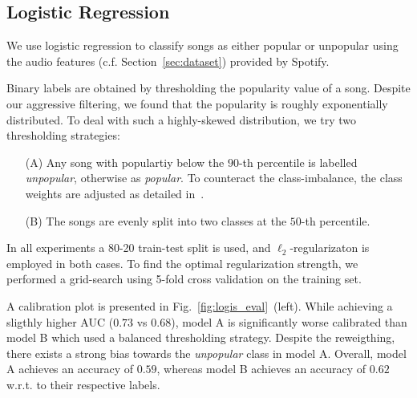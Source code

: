 \documentclass{article}
\begin{document}
\subsection{Logistic Regression}
We use logistic regression to classify songs as either popular or unpopular using the audio features (c.f. Section~\ref{sec:dataset}) provided by Spotify. 

Binary labels are obtained by thresholding the popularity value of a song. Despite our aggressive filtering, we found that the popularity is roughly exponentially distributed. To deal with such a highly-skewed distribution, we try two thresholding strategies:
\begin{enumerate}
  \item[(A)] Any song with populartiy below the $90$-th percentile is labelled \emph{unpopular}, otherwise as \emph{popular}. To counteract the class-imbalance, the class weights are adjusted as detailed in~\cite{haixiangLearningClassimbalancedData2017a}.
  \item[(B)] The songs are evenly split into two classes at the $50$-th percentile.
\end{enumerate}

In all experiments a 80-20 train-test split is used, and $\ell_2$-regularizaton is employed in both cases. To find the optimal regularization strength, we performed a grid-search using 5-fold cross validation on the training set.

A calibration plot is presented in Fig.~\ref{fig:logis_eval}~(left). While achieving a sligthly higher AUC ($0.73$ vs $0.68$), model A is significantly worse calibrated than model B which used a balanced thresholding strategy. Despite the reweigthing, there exists a strong bias towards the \emph{unpopular} class in model A. Overall, model A achieves an accuracy of $0.59$, whereas model B achieves an accuracy of $0.62$ w.r.t. to their respective labels.


\end{document}

